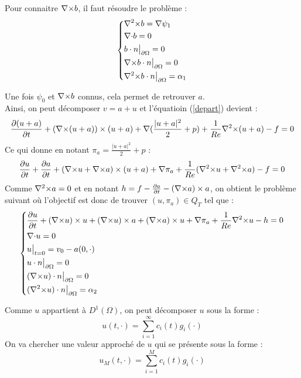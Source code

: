 Pour connaitre ${\nabla\times} b$, il faut résoudre le problème :
\begin{eqnarray}
\label{curlb}
\left\{
\begin{aligned}
&{\nabla^2\times} b = \nabla\psi_1\\
&{\nabla\cdot} b = 0\\
&b\cdot n\big\rvert_{\partial\Omega} = 0\\
&{\nabla\times} b\cdot n\big\rvert_{\partial\Omega} = 0\\
&{\nabla^2\times} b\cdot n\big\rvert_{\partial\Omega} = \alpha_1
\end{aligned}
\right.
\end{eqnarray}

Une fois $\psi_0$ et ${\nabla\times} b$ connus, cela permet de retrouver $a$.\\

Ainsi, on peut décomposer $v=a+u$ et l'équatioin (\ref{depart}) devient :
\[
\frac{\partial(u+a)}{\partial t}+({\nabla\times}(u+a))\times(u+a) + \nabla (\frac{|u+a|^2}{2}+p) + \frac{1}{Re}{\nabla^2\times}(u+a) - f = 0
\]
Ce qui donne en notant $\pi_a=\frac{|u+a|^2}{2}+p$ :
\[
\frac{\partial u}{\partial t}+\frac{\partial a}{\partial t} + ({\nabla\times} u+{\nabla\times} a)\times(u+a) + \nabla\pi_a + \frac{1}{Re}({\nabla^2\times} u+{\nabla^2\times} a) - f = 0
\]
Comme ${\nabla^2\times} a = 0$ et en notant $h=f-\frac{\partial a}{\partial t} - ({\nabla\times} a)\times a$, on obtient le problème suivant où l'objectif est donc de trouver $(u,\pi_a)\in Q_T$ tel que :
\begin{eqnarray}
\label{uci}
\left\{
\begin{aligned}
&\frac{\partial u}{\partial t} + ({\nabla\times} u)\times u + ({\nabla\times} u)\times a +({\nabla\times} a)\times u + \nabla \pi_a +\frac{1}{Re}{\nabla^2\times}  u - h = 0\\
&{\nabla\cdot} u = 0\\
&u\big\rvert_{t=0} = v_0 - a(0,\cdot)\\
&u\cdot n\big\rvert_{\partial\Omega} = 0\\
&({\nabla\times} u)\cdot n\big\rvert_{\partial\Omega} = 0\\
&({\nabla^2\times}  u)\cdot n\big\rvert_{\partial\Omega} = \alpha_2
\end{aligned}
\right.
\end{eqnarray}

Comme $u$ appartient à $D^1(\Omega)$, on peut décomposer $u$ sous la forme :
\[
u(t,\cdot) = \sum_{i=1}^{\infty} c_i(t)g_i(\cdot)
\]
On va chercher une valeur approché de $u$ qui se présente sous la forme :
\[
u_M(t,\cdot) = \sum_{i=1}^{M} c_i(t)g_i(\cdot)
\]

